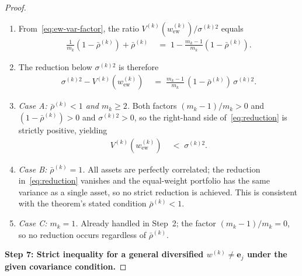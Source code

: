 \documentclass[12pt,openany]{book}
\newcommand{\bfw}{\mathbf{w}}
\newcommand{\bfe}{\mathbf{e}}
\numberwithin{equation}{chapter}
\theoremstyle{plain}
\theoremstyle{definition}
\theoremstyle{remark}
\def\bfw{w}%
\begin{document}
\begin{proof}
\begin{enumerate}
  \item From~\eqref{eq:ew-var-factor}, the ratio
        $V^{(k)}(\bfw^{(k)}_{\mathrm{ew}})/\sigma^{(k)2}$
        equals
        \begin{align}
          \frac{1}{m_k}(1 - \bar{\rho}^{(k)}) + \bar{\rho}^{(k)}
          &\;=\; 1 - \frac{m_k - 1}{m_k}(1 - \bar{\rho}^{(k)}).
          \label{eq:ratio}
        \end{align}
  \item The reduction below $\sigma^{(k)2}$ is therefore
        \begin{align}
          \sigma^{(k)2} - V^{(k)}(\bfw^{(k)}_{\mathrm{ew}})
          &\;=\; \frac{m_k - 1}{m_k}\,(1 - \bar{\rho}^{(k)})\,
                 \sigma^{(k)2}.
          \label{eq:reduction}
        \end{align}
  \item \textit{Case A: $\bar{\rho}^{(k)} < 1$ and $m_k \geq 2$.}
        Both factors $(m_k-1)/m_k > 0$ and $(1 - \bar{\rho}^{(k)})
        > 0$ and $\sigma^{(k)2} > 0$, so the right-hand side
        of~\eqref{eq:reduction} is strictly positive, yielding
        \begin{align}
          V^{(k)}(\bfw^{(k)}_{\mathrm{ew}}) &\;<\; \sigma^{(k)2}.
        \end{align}
  \item \textit{Case B: $\bar{\rho}^{(k)} = 1$.}
        All assets are perfectly correlated; the reduction
        in~\eqref{eq:reduction} vanishes and the equal-weight
        portfolio has the same variance as a single asset, so no
        strict reduction is achieved.  This is consistent with the
        theorem's stated condition $\bar{\rho}^{(k)} < 1$.
  \item \textit{Case C: $m_k = 1$.}
        Already handled in Step~2; the factor $(m_k-1)/m_k = 0$,
        so no reduction occurs regardless of $\bar{\rho}^{(k)}$.
\end{enumerate}

\medskip
\noindent\textbf{Step 7: Strict inequality for a general diversified
$\bfw^{(k)} \neq \bfe_j$ under the given covariance condition.}


\end{proof}
\end{document}
